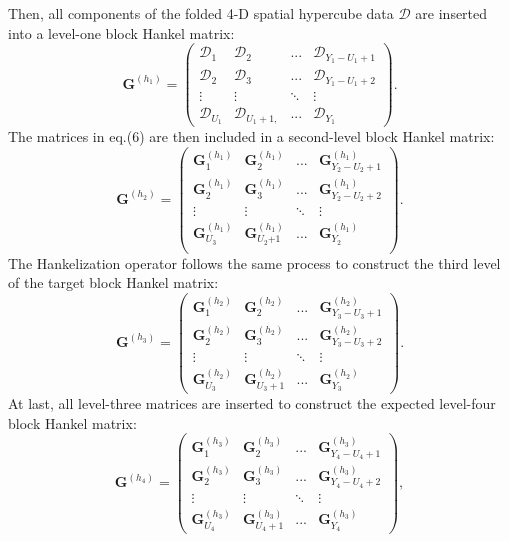 Then, all components of the folded 4-D spatial hypercube data $\mathcal{D}$ are inserted into a level-one block Hankel matrix:
\begin{equation}
\textbf{G}^{(h_1)}=\begin{pmatrix}
\mathcal{D}_{1} & \mathcal{D}_{2} & ... & \mathcal{D}_{Y_{1}-U_{1}+1}\\ 
\mathcal{D}_{2} & \mathcal{D}_{3} & ... & \mathcal{D}_{Y_{1}-U_{1}+2}\\ 
\vdots & \vdots & \ddots & \vdots\\
\mathcal{D}_{{U_{1}}{}} & \mathcal{D}_{{U_{1}+1},}  & ... & \mathcal{D}_{Y_{1}}
\end{pmatrix}.
\end{equation}
The matrices in eq.(6) are then included in a second-level block Hankel matrix:
\begin{equation}
\textbf{G}^{(h_2)}=\begin{pmatrix}
\textbf{G}^{(h_1)}_{1} & \textbf{G}^{(h_1)}_{2} & ... & \textbf{G}^{(h_1)}_{Y_{2}-U_{2}+1}\\ 
\textbf{G}^{(h_1)}_{2} & \textbf{G}^{(h_1)}_{3} & ... & \textbf{G}^{(h_1)}_{Y_{2}-U_{2}+2}\\
\vdots & \vdots & \ddots & \vdots\\
\textbf{G}^{(h_1)}_{U_{3}} & \textbf{G}^{(h_1)}_{U_{2}{+1}} & ... & \textbf{G}^{(h_1)}_{Y_{2}}\\ 
\end{pmatrix}.
\end{equation}
The Hankelization operator follows the same process to construct the third level of the target block Hankel matrix:
\begin{equation}
\textbf{G}^{(h_3)}=\begin{pmatrix}
\textbf{G}^{(h_2)}_{1} & \textbf{G}^{(h_2)}_{2} & ... & \textbf{G}^{(h_2)}_{Y_{3}-U_{3}+1}\\ 
\textbf{G}^{(h_2)}_{2} & \textbf{G}^{(h_2)}_{3} & ... & \textbf{G}^{(h_2)}_{Y_{3}-U_{3}+2}\\ 	
\vdots & \vdots & \ddots & \vdots\\
\textbf{G}^{(h_2)}_{U_{3}} & \textbf{G}^{(h_2)}_{U_{3}+1} & ... & \textbf{G}^{(h_2)}_{Y_{3}}
\end{pmatrix}.
\end{equation}
At last, all level-three matrices are inserted to construct the expected level-four block Hankel matrix:
\begin{equation}
\textbf{G}^{(h_4)}=\begin{pmatrix}
\textbf{G}^{(h_3)}_1 & \textbf{G}^{(h_3)}_2 & ... & \textbf{G}^{(h_3)}_{Y_4-U_4+1}\\ 
\textbf{G}^{(h_3)}_2 & \textbf{G}^{(h_3)}_3 & ... & \textbf{G}^{(h_3)}_{Y_4-U_4+2}\\ 
\vdots & \vdots & \ddots & \vdots\\
\textbf{G}^{(h_3)}_{U_{4}} & \textbf{G}^{(h_3)}_{U_{4} +1} & ... & \textbf{G}^{(h_3)}_{Y_{4}}
\end{pmatrix},
\end{equation}
